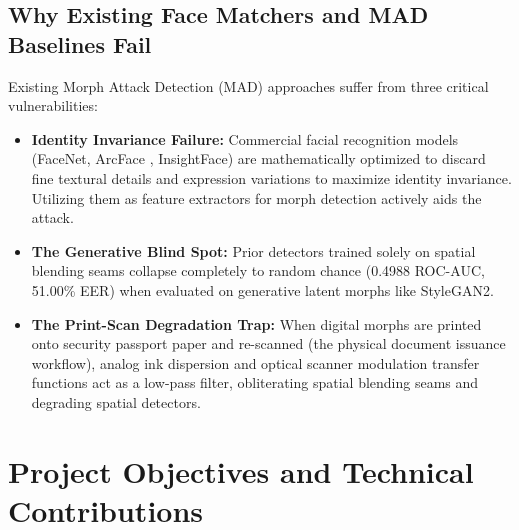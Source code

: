 \documentclass[11pt,a4paper]{article}
\begin{document}
\subsection{Why Existing Face Matchers and MAD Baselines Fail}
Existing Morph Attack Detection (MAD) approaches suffer from three critical vulnerabilities:
\begin{itemize}[leftmargin=*]
    \item \textbf{Identity Invariance Failure:} Commercial facial recognition models (FaceNet, ArcFace \cite{deng2019arcface}, InsightFace) are mathematically optimized to discard fine textural details and expression variations to maximize identity invariance. Utilizing them as feature extractors for morph detection actively aids the attack.
    \item \textbf{The Generative Blind Spot:} Prior detectors trained solely on spatial blending seams collapse completely to random chance (0.4988 ROC-AUC, 51.00\% EER) when evaluated on generative latent morphs like StyleGAN2.
    \item \textbf{The Print-Scan Degradation Trap:} When digital morphs are printed onto security passport paper and re-scanned (the physical document issuance workflow), analog ink dispersion and optical scanner modulation transfer functions act as a low-pass filter, obliterating spatial blending seams and degrading spatial detectors.
\end{itemize}

\section{Project Objectives and Technical Contributions}
\label{sec:objectives}
\end{document}
